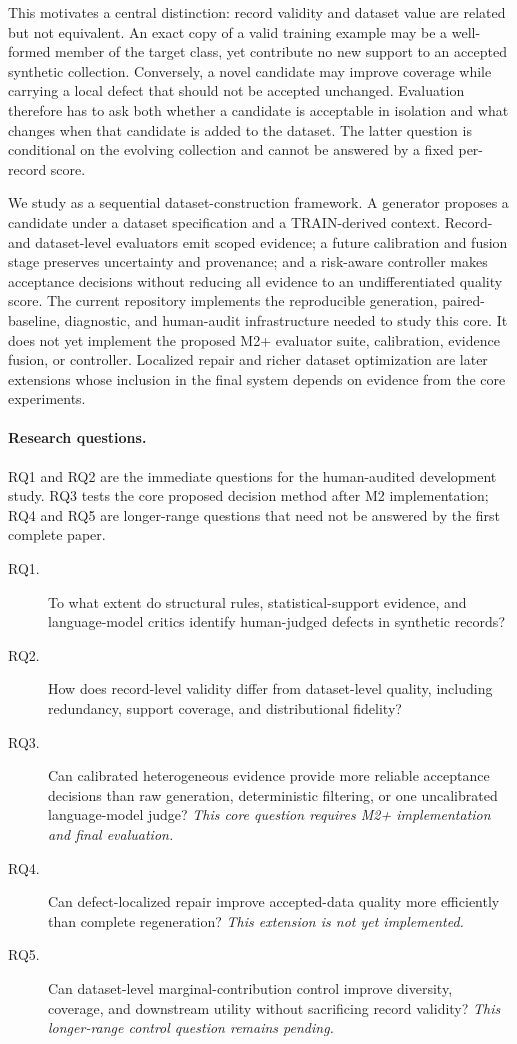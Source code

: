 This motivates a central distinction: record validity and dataset value are
related but not equivalent. An exact copy of a valid training example may be a
well-formed member of the target class, yet contribute no new support to an
accepted synthetic collection. Conversely, a novel candidate may improve
coverage while carrying a local defect that should not be accepted unchanged.
Evaluation therefore has to ask both whether a candidate is acceptable in
isolation and what changes when that candidate is added to the dataset. The
latter question is conditional on the evolving collection and cannot be
answered by a fixed per-record score.

We study \rcqasyn{} as a sequential dataset-construction framework. A
generator proposes a candidate under a dataset specification and a
TRAIN-derived context. Record- and dataset-level evaluators emit scoped
evidence; a future calibration and fusion stage preserves uncertainty and
provenance; and a risk-aware controller makes acceptance decisions without
reducing all evidence to an undifferentiated quality score. The current
repository implements the reproducible generation, paired-baseline,
diagnostic, and human-audit infrastructure needed to study this core. It does
not yet implement the proposed M2+ evaluator suite, calibration, evidence
fusion, or controller. Localized repair and richer dataset optimization are
later extensions whose inclusion in the final system depends on evidence from
the core experiments.

\paragraph{Research questions.}
RQ1 and RQ2 are the immediate questions for the human-audited development
study. RQ3 tests the core proposed decision method after M2 implementation;
RQ4 and RQ5 are longer-range questions that need not be answered by the first
complete paper.

\begin{description}
  \item[RQ1.] To what extent do structural rules, statistical-support
    evidence, and language-model critics identify human-judged defects in
    synthetic records?
  \item[RQ2.] How does record-level validity differ from dataset-level quality,
    including redundancy, support coverage, and distributional fidelity?
  \item[RQ3.] Can calibrated heterogeneous evidence provide more reliable
    acceptance decisions than raw generation, deterministic filtering, or one
    uncalibrated language-model judge? \emph{This core question requires M2+
    implementation and final evaluation.}
  \item[RQ4.] Can defect-localized repair improve accepted-data quality more
    efficiently than complete regeneration? \emph{This extension is not yet
    implemented.}
  \item[RQ5.] Can dataset-level marginal-contribution control improve
    diversity, coverage, and downstream utility without sacrificing record
    validity? \emph{This longer-range control question remains pending.}
\end{description}

